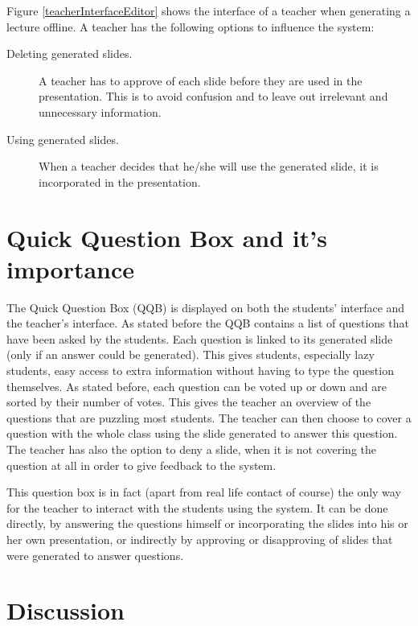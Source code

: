 \documentclass[11pt]{article}
\begin{document}
Figure \ref{teacherInterfaceEditor} shows the interface of a teacher when generating a lecture offline. A teacher has the following options to influence the system: 
\begin{description}
\item[Deleting generated slides.] A teacher has to approve of each slide before they are used in the presentation. This is to avoid confusion and to leave out irrelevant and unnecessary information.
\item[Using generated slides.] When a teacher decides that he/she will use the generated slide, it is incorporated in the presentation. 
\end{description}

\section{Quick Question Box and it's importance}
The Quick Question Box (QQB) is displayed on both the students' interface and the teacher's interface. As stated before the QQB contains a list of questions that have been asked by the students. Each question is linked to its generated slide (only if an answer could be generated). This gives students, especially lazy students, easy access to extra information without having to type the question themselves. As stated before, each question can be voted up or down and are sorted by their number of votes. This gives the teacher an overview of the questions that are puzzling most students. The teacher can then choose to cover a question with the whole class using the slide generated to answer this question. The teacher has also the option to deny a slide, when it is not covering the question at all in order to give feedback to the system. 

This question box is in fact (apart from real life contact of course) the only way for the teacher to interact with the students using the system. It can be done directly, by answering the questions himself or incorporating the slides into his or her own presentation, or indirectly by approving or disapproving of slides that were generated to answer questions. 



\section{Discussion}
\end{document}
